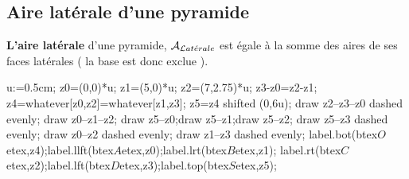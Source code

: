 \subsection{Aire latérale d'une pyramide}
\begin{definition}
    \begin{minipage}{0.7\linewidth}
        \textbf{L'aire latérale} d'une pyramide, ${\cal A}_{{\cal L}at\acute erale}$ est égale à la somme des aires de ses faces latérales ( la base est donc exclue ).
    \end{minipage}
    \hspace*{-10mm}
    \begin{minipage}{0.25\linewidth}
        \begin{center}
            \begin{Geometrie}[CoinBG={(-4u,-2.5u)}]
                u:=0.5cm;
                z0=(0,0)*u;
                z1=(5,0)*u;
                z2=(7,2.75)*u;
                z3-z0=z2-z1;
                z4=whatever[z0,z2]=whatever[z1,z3];
                z5=z4 shifted (0,6u);
                draw z2--z3--z0 dashed evenly;
                draw z0--z1--z2; draw z5--z0;draw z5--z1;draw z5--z2; draw z5--z3 dashed evenly;
                draw z0--z2 dashed evenly; draw z1--z3 dashed evenly;
                label.bot(btex$O$etex,z4);label.llft(btex$A$etex,z0);label.lrt(btex$B$etex,z1);
                label.rt(btex$C$etex,z2);label.lft(btex$D$etex,z3);label.top(btex$S$etex,z5);
            \end{Geometrie}
        \end{center}
    \end{minipage}
\end{definition}